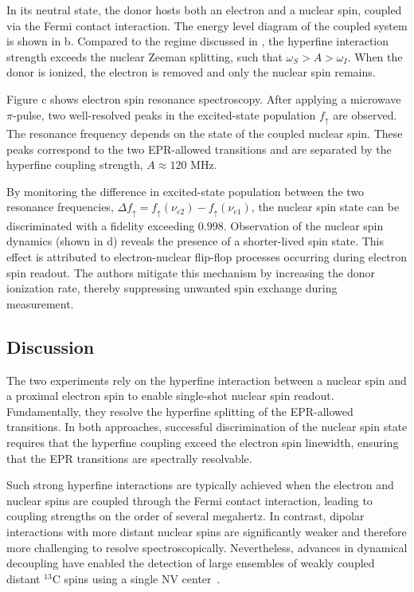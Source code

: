 In its neutral state, the donor hosts both an electron and a nuclear spin, coupled via the Fermi contact interaction. The energy level diagram of the coupled system is shown in b. Compared to the regime discussed in , the hyperfine interaction strength exceeds the nuclear Zeeman splitting, such that $\omega_S > A > \omega_I$. When the donor is ionized, the electron is removed and only the nuclear spin remains.

Figure c shows electron spin resonance spectroscopy. After applying a microwave $\pi$-pulse, two well-resolved peaks in the excited-state population $f_\uparrow$ are observed. The resonance frequency depends on the state of the coupled nuclear spin. These peaks correspond to the two EPR-allowed transitions and are separated by the hyperfine coupling strength, $A \approx 120$ MHz.

By monitoring the difference in excited-state population between the two resonance frequencies, $\Delta f_\uparrow = f_\uparrow(\nu_{e2}) - f_\uparrow(\nu_{e1})$, the nuclear spin state can be discriminated with a fidelity exceeding $0.998$. Observation of the nuclear spin dynamics (shown in d) reveals the presence of a shorter-lived spin state. This effect is attributed to electron-nuclear flip-flop processes occurring during electron spin readout. The authors mitigate this mechanism by increasing the donor ionization rate, thereby suppressing unwanted spin exchange during measurement.

\subsection*{Discussion}

The two experiments rely on the hyperfine interaction between a nuclear spin and a proximal electron spin to enable single-shot nuclear spin readout. Fundamentally, they resolve the hyperfine splitting of the EPR-allowed transitions. In both approaches, successful discrimination of the nuclear spin state requires that the hyperfine coupling exceed the electron spin linewidth, ensuring that the EPR transitions are spectrally resolvable.

Such strong hyperfine interactions are typically achieved when the electron and nuclear spins are coupled through the Fermi contact interaction, leading to coupling strengths on the order of several megahertz. In contrast, dipolar interactions with more distant nuclear spins are significantly weaker and therefore more challenging to resolve spectroscopically. Nevertheless, advances in dynamical decoupling have enabled the detection of large ensembles of weakly coupled distant $^{13}\mathrm{C}$ spins using a single NV center~.

